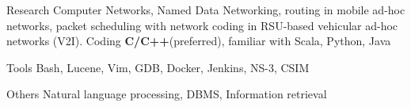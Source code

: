 
\begin{cvskills}

  \cvskill
    {Research} %
    {Computer Networks, Named Data Networking, routing in mobile ad-hoc networks, packet scheduling with network coding in RSU-based vehicular ad-hoc networks (V2I).} %
  \cvskill
    {Coding} %
    {\textbf{C/C++}(preferred), familiar with Scala, Python, Java} %

 \cvskill
   {Tools} %
   {Bash, Lucene, Vim, GDB, Docker, Jenkins, NS-3, CSIM} %

 \cvskill
   {Others} %
   {Natural language processing, DBMS, Information retrieval} %

\end{cvskills}
